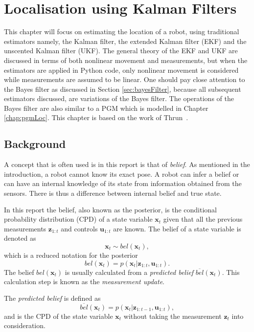 \documentclass[12pt,oneside,openany,a4paper, %
afrikaans,english,
]{memoir}
\numberwithin{equation}{chapter}
\begin{document}
{\chapter{Localisation using Kalman Filters}\label{chap:kalmanFilter}
This chapter will focus on estimating the location of a robot, using traditional estimators namely, the Kalman filter, the extended Kalman filter (EKF) and the unscented Kalman filter (UKF). The general theory of the EKF and UKF are discussed in terms of both nonlinear movement and measurements, but when the estimators are applied in Python code, only nonlinear movement is considered while measurements are assumed to be linear. One should pay close attention to the Bayes filter as discussed in Section \ref{sec:bayesFilter}, because all subsequent estimators discussed, are variations of the Bayes filter. The operations of the Bayes filter are also similar to a PGM which is modelled in Chapter \ref{chap:pgmLoc}. This chapter is based on the work of Thrun~\citep{thrun}. 

\section{Background}
A concept that is often used is in this report is that of \textit{belief}. As mentioned in the introduction, a robot cannot know its exact pose. A robot can infer a belief or can have an internal knowledge of its state from information obtained from the sensors. There is thus a difference between internal belief and true state.

In this report the belief, also known as the posterior, is the conditional probability distribution (CPD) of a state variable $\bm{x}_t$ given that all the previous measurements $\bm{z}_{1:t}$ and controls $\bm{u}_{1:t}$ are known. The belief of a state variable is denoted as
\begin{equation}
\bm{x}_t \sim bel(\bm{x}_t),
\end{equation}
which is a reduced notation for the posterior
\begin{equation}
bel(\bm{x}_t) = p(\bm{x}_t| \bm{z}_{1:t}, \bm{u}_{1:t}).
\end{equation}
The belief $bel(\bm{x}_t)$ is usually calculated from a \textit{predicted belief} $\overline{bel}(\bm{x}_t)$. This calculation step is known as the \textit{measurement update}.

The \textit{predicted belief} is defined as
\begin{equation}
\overline{bel}(\bm{x}_t) = p(\bm{x}_t|\bm{z}_{1:t-1}, \bm{u}_{1:t}),
\end{equation} 
and is the CPD of the state variable $\bm{x}_t$ without taking the measurement $\bm{z}_t$ into consideration.
}
\end{document}
